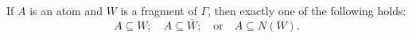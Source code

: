 If $A$ is an atom and $W$ is a fragment of $\Gamma$, then exactly one of the following holds:
$$A \subseteq W; \quad A \subseteq \overline{W}; \quad \text{or} \quad A \subseteq N(W).$$
